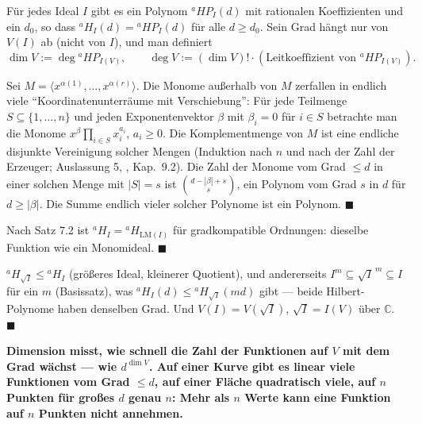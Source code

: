 \begin{merksatz}
Für jedes Ideal $I$ gibt es ein Polynom ${}^{a}\!HP_I(d)$ mit rationalen Koeffizienten und ein $d_0$, so dass ${}^{a}\!H_I(d) = {}^{a}\!HP_I(d)$ für alle $d\ge d_0$. Sein Grad hängt nur von $V(I)$ ab (nicht von $I$), und man definiert
\[ \dim V := \deg{}^{a}\!HP_{I(V)}, \qquad \deg V := (\dim V)!\cdot(\text{Leitkoeffizient von }{}^{a}\!HP_{I(V)}) . \]

Sei $M = \langle x^{\alpha(1)}, \ldots, x^{\alpha(r)}\rangle$. Die Monome außerhalb von $M$ zerfallen in endlich viele \enquote{Koordinatenunterräume mit Verschiebung}: Für jede Teilmenge $S\subseteq\{1, \ldots, n\}$ und jeden Exponentenvektor $\beta$ mit $\beta_i = 0$ für $i\in S$ betrachte man die Monome $x^{\beta}\prod_{i\in S}x_i^{a_i}$, $a_i\ge0$. Die Komplementmenge von $M$ ist eine endliche disjunkte Vereinigung solcher Mengen (Induktion nach $n$ und nach der Zahl der Erzeuger; Auslassung 5, , Kap.~9.2). Die Zahl der Monome vom Grad $\le d$ in einer solchen Menge mit $|S| = s$ ist $\binom{d - |\beta| + s}{s}$, ein Polynom vom Grad $s$ in $d$ für $d\ge|\beta|$. Die Summe endlich vieler solcher Polynome ist ein Polynom. $\blacksquare$

Nach Satz 7.2 ist ${}^{a}\!H_I = {}^{a}\!H_{\mathrm{LM}(I)}$ für gradkompatible Ordnungen: dieselbe Funktion wie ein Monomideal. $\blacksquare$

${}^{a}\!H_{\sqrt I}\le{}^{a}\!H_I$ (größeres Ideal, kleinerer Quotient), und andererseits $I^{m}\subseteq\sqrt I^{\,m}\subseteq I$ für ein $m$ (Basissatz), was ${}^{a}\!H_I(d)\le{}^{a}\!H_{\sqrt I}(md)$ gibt --- beide Hilbert-Polynome haben denselben Grad. Und $V(I) = V(\sqrt I)$, $\sqrt I = I(V)$ über $\mathbb C$. $\blacksquare$

\begin{center}
\begin{minipage}{0.9\textwidth}
\textbf{Dimension misst, wie schnell die Zahl der Funktionen auf $V$ mit dem Grad wächst --- wie $d^{\dim V}$. Auf einer Kurve gibt es linear viele Funktionen vom Grad $\le d$, auf einer Fläche quadratisch viele, auf $n$ Punkten für großes $d$ genau $n$: Mehr als $n$ Werte kann eine Funktion auf $n$ Punkten nicht annehmen.}
\end{minipage}
\end{center}


\end{merksatz}
